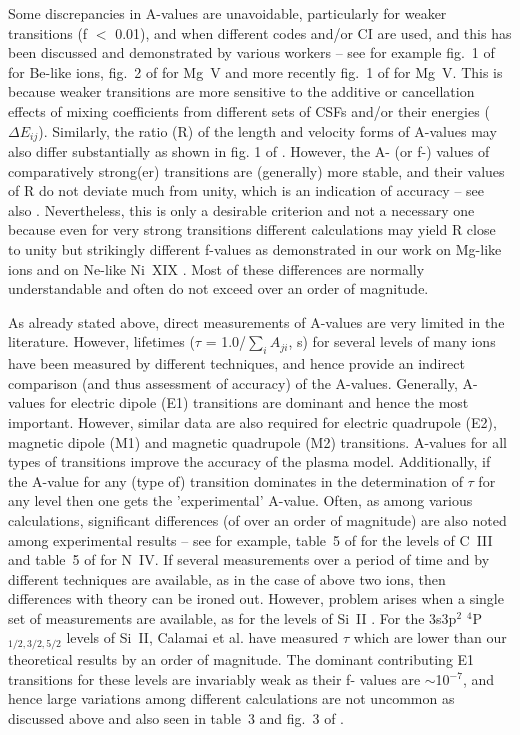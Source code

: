\documentclass[fleqn]{article}
\begin{document}
Some discrepancies in A-values are unavoidable, particularly for weaker transitions (f $<$ 0.01), and when different codes and/or CI are used, and this has been discussed and demonstrated by various workers -- see for example fig.~1  of \cite{nrbelike}  for Be-like ions,  fig.~2 of \cite{sstmg5} for Mg~V and more recently fig.~1 of \cite{kbmgv} for Mg~V. This is because weaker transitions are more sensitive to the additive or cancellation effects of mixing coefficients from different sets  of CSFs and/or their energies ($\Delta E_{ij}$). Similarly, the ratio (R) of  the length and velocity forms of A-values may also  differ substantially as shown in fig. 1 of \cite{sstmg5}. However, the A- (or f-) values of comparatively strong(er) transitions  are (generally) more stable, and their values of R do not deviate much from  unity, which is an indication of accuracy --  see also \cite{uq}. Nevertheless, this is only a desirable criterion and not a necessary one because even for very strong transitions different calculations may yield R close to unity but strikingly different f-values as demonstrated in our work on Mg-like ions \cite{mglike} and on Ne-like Ni~XIX \cite{ni19}. Most of these differences are normally understandable and often do not exceed over an order of magnitude.

As already stated above, direct measurements of A-values are  very limited in the literature. However, lifetimes ($\tau$ = 1.0/${\sum_{i}} A_{ji}$, s) for several levels of many ions have been measured by different techniques, and hence provide an indirect comparison (and thus assessment of accuracy) of the A-values. Generally, A-values for electric dipole (E1) transitions are dominant and hence the most important. However, similar data are also required for electric quadrupole (E2), magnetic dipole (M1) and  magnetic quadrupole (M2) transitions.  A-values for all types of transitions improve the accuracy of the plasma model. Additionally, if the A-value for any (type of) transition dominates in the determination of $\tau$ for any level then one gets the 'experimental' A-value.  Often, as among various calculations, significant differences (of over an order of magnitude) are also noted among experimental results -- see for example, table~5 of \cite{ciii} for the levels of C~III and table~5 of \cite{niv} for N~IV. If several measurements over a period of time and by different techniques are available, as in the case of above two ions, then differences with theory can be ironed out. However, problem arises when a single set of measurements are available, as  for the levels of Si~II \cite{si2a}.   For the 3s3p$^2$ $^4$P$_{1/2,3/2,5/2}$ levels  of Si~II,  Calamai et al. \cite{cal} have measured $\tau$ which are lower than our theoretical results \cite{si2a} by an order of magnitude. The dominant contributing E1  transitions for these levels are invariably weak as their  f- values are $\sim$10$^{-7}$, and hence large variations among different calculations are not uncommon as discussed above and also seen in table~3 and fig.~3 of \cite{baut1}. 
\end{document}
